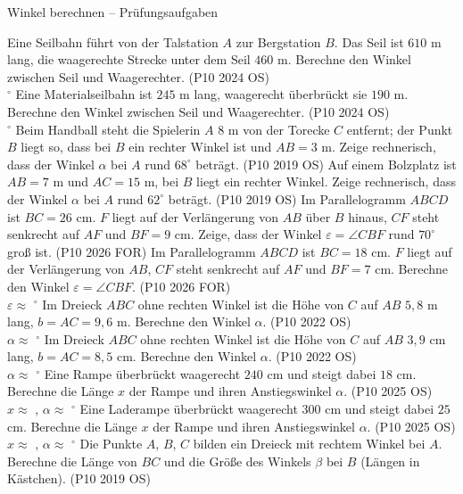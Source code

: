 \begin{aufgabe}{Winkel berechnen – Prüfungsaufgaben}
\begin{teile}
\teil Eine Seilbahn führt von der Talstation $A$ zur Bergstation $B$. Das Seil ist $610$ m lang, die waagerechte Strecke unter dem Seil $460$ m. Berechne den Winkel zwischen Seil und Waagerechter. \hfill (P10 2024 OS) \\ \leerfeld $^\circ$
\teil Eine Materialseilbahn ist $245$ m lang, waagerecht überbrückt sie $190$ m. Berechne den Winkel zwischen Seil und Waagerechter. \hfill (P10 2024 OS) \\ \leerfeld $^\circ$
\teil Beim Handball steht die Spielerin $A$ $8$ m von der Torecke $C$ entfernt; der Punkt $B$ liegt so, dass bei $B$ ein rechter Winkel ist und $AB = 3$ m. Zeige rechnerisch, dass der Winkel $\alpha$ bei $A$ rund $68^\circ$ beträgt. \hfill (P10 2019 OS)
\teil Auf einem Bolzplatz ist $AB = 7$ m und $AC = 15$ m, bei $B$ liegt ein rechter Winkel. Zeige rechnerisch, dass der Winkel $\alpha$ bei $A$ rund $62^\circ$ beträgt. \hfill (P10 2019 OS)
\teil Im Parallelogramm $ABCD$ ist $BC = 26$ cm. $F$ liegt auf der Verlängerung von $AB$ über $B$ hinaus, $CF$ steht senkrecht auf $AF$ und $BF = 9$ cm. Zeige, dass der Winkel $\varepsilon = \angle CBF$ rund $70^\circ$ groß ist. \hfill (P10 2026 FOR)
\teil Im Parallelogramm $ABCD$ ist $BC = 18$ cm. $F$ liegt auf der Verlängerung von $AB$, $CF$ steht senkrecht auf $AF$ und $BF = 7$ cm. Berechne den Winkel $\varepsilon = \angle CBF$. \hfill (P10 2026 FOR) \\ $\varepsilon \approx$ \leerfeld $^\circ$
\teil Im Dreieck $ABC$ ohne rechten Winkel ist die Höhe von $C$ auf $AB$ $5{,}8$ m lang, $b = AC = 9{,}6$ m. Berechne den Winkel $\alpha$. \hfill (P10 2022 OS) \\ $\alpha \approx$ \leerfeld $^\circ$
\teil Im Dreieck $ABC$ ohne rechten Winkel ist die Höhe von $C$ auf $AB$ $3{,}9$ cm lang, $b = AC = 8{,}5$ cm. Berechne den Winkel $\alpha$. \hfill (P10 2022 OS) \\ $\alpha \approx$ \leerfeld $^\circ$
\teil Eine Rampe überbrückt waagerecht $240$ cm und steigt dabei $18$ cm. Berechne die Länge $x$ der Rampe und ihren Anstiegswinkel $\alpha$. \hfill (P10 2025 OS) \\ $x \approx$ \leerfeld[cm] , $\alpha \approx$ \leerfeld $^\circ$
\teil Eine Laderampe überbrückt waagerecht $300$ cm und steigt dabei $25$ cm. Berechne die Länge $x$ der Rampe und ihren Anstiegswinkel $\alpha$. \hfill (P10 2025 OS) \\ $x \approx$ \leerfeld[cm] , $\alpha \approx$ \leerfeld $^\circ$
\teil Die Punkte $A$, $B$, $C$ bilden ein Dreieck mit rechtem Winkel bei $A$. Berechne die Länge von $BC$ und die Größe des Winkels $\beta$ bei $B$ (Längen in Kästchen). \hfill (P10 2019 OS) \\


\end{teile}
\end{aufgabe}
